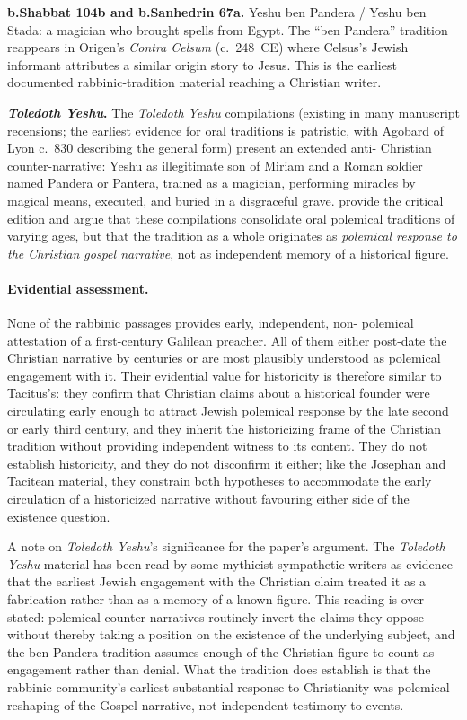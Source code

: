 \documentclass[12pt,oneside]{article}
\begin{document}
\textbf{b.Shabbat 104b and b.Sanhedrin 67a.}  Yeshu ben Pandera /
Yeshu ben Stada: a magician who brought spells from Egypt.  The
\enquote{ben Pandera} tradition reappears in Origen's
\textit{Contra Celsum} (c.~248~CE) where Celsus's Jewish
informant attributes a similar origin story to Jesus.  This is the
earliest documented rabbinic-tradition material reaching a
Christian writer.

\textbf{\textit{Toledoth Yeshu}.}  The \textit{Toledoth Yeshu}
compilations (existing in many manuscript recensions; the earliest
evidence for oral traditions is patristic, with Agobard of Lyon
c.~830 describing the general form) present an extended anti-
Christian counter-narrative: Yeshu as illegitimate son of Miriam
and a Roman soldier named Pandera or Pantera, trained as a
magician, performing miracles by magical means, executed, and
buried in a disgraceful grave.  \citet{MeersonSchafer2014} provide
the critical edition and argue that these compilations
consolidate oral polemical traditions of varying ages, but that
the tradition as a whole originates as \textit{polemical response
to the Christian gospel narrative}, not as independent memory of a
historical figure.

\paragraph{Evidential assessment.}
None of the rabbinic passages provides early, independent, non-
polemical attestation of a first-century Galilean preacher.  All of
them either post-date the Christian narrative by centuries or
are most plausibly understood as polemical engagement with it.
Their evidential value for historicity is therefore similar to
Tacitus's: they confirm that Christian claims about a historical
founder were circulating early enough to attract Jewish polemical
response by the late second or early third century, and they
inherit the historicizing frame of the Christian tradition without
providing independent witness to its content.  They do not
establish historicity, and they do not disconfirm it either; like
the Josephan and Tacitean material, they constrain both hypotheses
to accommodate the early circulation of a historicized narrative
without favouring either side of the existence question.

A note on \textit{Toledoth Yeshu}'s significance for the paper's
argument.  The \textit{Toledoth Yeshu} material has been read by
some mythicist-sympathetic writers as evidence that the earliest
Jewish engagement with the Christian claim treated it as a
fabrication rather than as a memory of a known figure.  This
reading is over-stated: polemical counter-narratives routinely
invert the claims they oppose without thereby taking a position on
the existence of the underlying subject, and the ben Pandera
tradition assumes enough of the Christian figure to count as
engagement rather than denial.  What the tradition does establish
is that the rabbinic community's earliest substantial response to
Christianity was polemical reshaping of the Gospel narrative, not
independent testimony to events.
\end{document}

